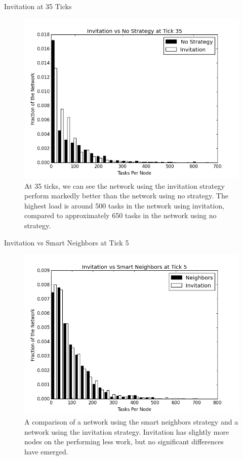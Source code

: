 \documentclass[11pt]{beamer}
\begin{document}
\begin{frame}{Invitation at 35 Ticks}
\begin{figure}
	\centering
	\includegraphics[width=0.7\linewidth]{figs/inviteStableHist35}
	\caption[Invitiation vs no strategy after 35 ticks]{At 35 ticks, we can see the network using the invitation strategy perform markedly better than the network using no strategy. The highest load is around 500 tasks in the network using invitation, compared to approximately 650 tasks in the network using no strategy.}
	\label{fig:inviteStableHist35}
\end{figure}
\end{frame}


\begin{frame}{Invitation vs Smart Neighbors at Tick 5}

\begin{figure}
	\centering
	\includegraphics[width=0.7\linewidth]{figs/inviteNeighborsHist5}
	\caption[Invitation  vs smart neighbor injection after 5 ticks.]{A comparison of a network using the smart neighbors strategy and a network using the invitation strategy.  Invitation has slightly more nodes on the performing less work, but no significant differences have emerged.}
	\label{fig:inviteNeighborsHist5}
\end{figure}


\end{frame}
\end{document}
